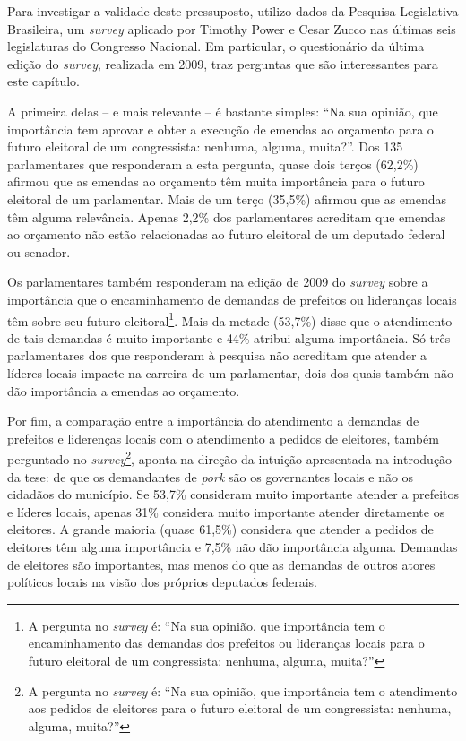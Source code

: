 Para investigar a validade deste pressuposto, utilizo dados da Pesquisa Legislativa Brasileira, um \emph{survey} aplicado por Timothy Power e Cesar Zucco nas últimas seis legislaturas do Congresso Nacional. Em particular, o questionário da última edição do \emph{survey}, realizada em 2009, traz perguntas que são interessantes para este capítulo.

A primeira delas -- e mais relevante -- é bastante simples: ``Na sua opinião, que importância tem aprovar e obter a execução de emendas ao orçamento para o futuro eleitoral de um congressista: nenhuma, alguma, muita?''. Dos 135 parlamentares que responderam a esta pergunta, quase dois terços (62,2\%) afirmou que as emendas ao orçamento têm muita importância para o futuro eleitoral de um parlamentar. Mais de um terço (35,5\%) afirmou que as emendas têm alguma relevância. Apenas 2,2\% dos parlamentares acreditam que emendas ao orçamento não estão relacionadas ao futuro eleitoral de um deputado federal ou senador.

Os parlamentares também responderam na edição de 2009 do \emph{survey} sobre a importância que o encaminhamento de demandas de prefeitos ou lideranças locais têm sobre seu futuro eleitoral\footnote{A pergunta no \emph{survey} é: ``Na sua opinião, que importância tem o encaminhamento das demandas dos prefeitos ou lideranças locais para o futuro eleitoral de um congressista: nenhuma, alguma, muita?''}. Mais da metade (53,7\%) disse que o atendimento de tais demandas é muito importante e 44\% atribui alguma importância. Só três parlamentares dos que responderam à pesquisa não acreditam que atender a líderes locais impacte na carreira de um parlamentar, dois dos quais também não dão importância a emendas ao orçamento.

Por fim, a comparação entre a importância do atendimento a demandas de prefeitos e liderenças locais com o atendimento a pedidos de eleitores, também perguntado no \emph{survey}\footnote{A pergunta no \emph{survey} é: ``Na sua opinião, que importância tem o atendimento aos pedidos de eleitores para o futuro eleitoral de um congressista: nenhuma, alguma, muita?''}, aponta na direção da intuição apresentada na introdução da tese: de que os demandantes de \emph{pork} são os governantes locais e não os cidadãos do município. Se 53,7\% consideram muito importante atender a prefeitos e líderes locais, apenas 31\% considera muito importante atender diretamente os eleitores. A grande maioria (quase 61,5\%) considera que atender a pedidos de eleitores têm alguma importância e 7,5\% não dão importância alguma. Demandas de eleitores são importantes, mas menos do que as demandas de outros atores políticos locais na visão dos próprios deputados federais.

